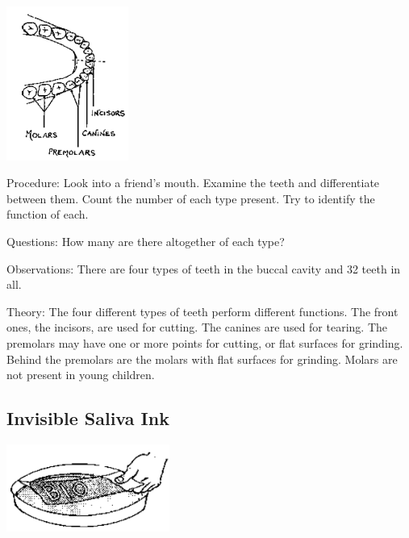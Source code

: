 \begin{multicols}{2}
\begin{center}
\includegraphics[width=0.3\textwidth]{./img/source/teeth-types.png}
\end{center}

\begin{description*}
\item[Procedure:]{Look into a friend's mouth. Examine the teeth and differentiate between them. Count the
number of each type present. Try to identify the function of each.}
\item[Questions:]{How many are there altogether of each type?}
\item[Observations:]{There are four types of teeth in the buccal cavity and 32 teeth in all.}
\item[Theory:]{The four different types of teeth perform different functions. The front ones, the incisors,
are used for cutting. The canines are used for tearing. The premolars may have one or more
points for cutting, or flat surfaces for grinding. Behind the premolars are the molars with flat
surfaces for grinding. Molars are not present in young children.}
\end{description*}

\subsection{Invisible Saliva Ink} %

\begin{center}
\includegraphics[width=0.4\textwidth]{./img/source/saliva-ink.png}
\end{center}


\end{multicols}
